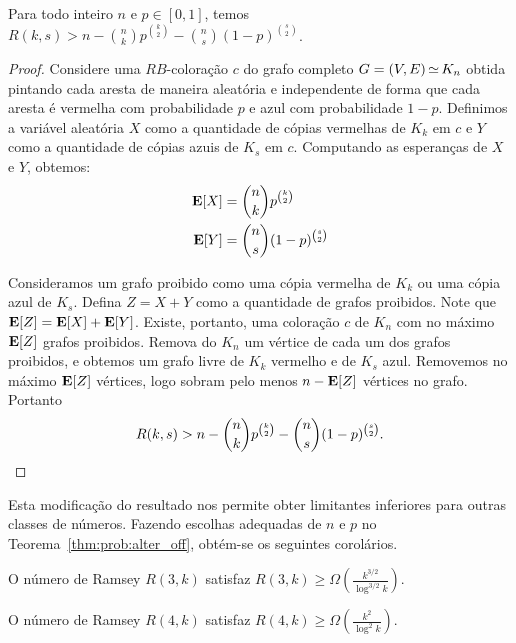 \begin{theorem}
\label{thm:prob:alter_off}
Para todo inteiro $n$ e $p \in [0,1]$, temos $\displaystyle R(k, s) > n - \binom{n}{k}p^{\binom{k}{2}} - \binom{n}{s}(1-p)^{\binom{s}{2}}$.
\end{theorem}
\begin{proof}
Considere uma $RB$-coloração $c$ do grafo completo $G = (V,E) \operatorname{\simeq} K_n$ obtida pintando cada aresta de maneira aleatória e independente de forma que cada aresta é vermelha com probabilidade $p$ e azul com probabilidade $1-p$.
Definimos a variável aleatória $X$ como a quantidade de cópias vermelhas de $K_k$ em $c$ e $Y$ como a quantidade de cópias azuis de $K_s$ em $c$. Computando as esperanças de $X$ e $Y$, obtemos:
\begin{align*}
\operatorname{\mathbf{E}}[X] &= \binom{n}{k}p^{\binom{k}{2}} \\
\operatorname{\mathbf{E}}[Y] &= \binom{n}{s}(1-p)^{\binom{s}{2}}
\end{align*}

Consideramos um grafo proibido como uma cópia vermelha de $K_k$ ou uma cópia azul de $K_s$. Defina $Z = X + Y$ como a quantidade de grafos proibidos. Note que $\operatorname{\mathbf{E}}[Z] = \operatorname{\mathbf{E}}[X] + \operatorname{\mathbf{E}}[Y]$. Existe, portanto, uma coloração $c$ de $K_n$ com no máximo $\operatorname{\mathbf{E}}[Z]$ grafos proibidos. Remova do $K_n$ um vértice de cada um dos grafos proibidos, e obtemos um grafo livre de $K_k$ vermelho e de $K_s$ azul. Removemos no máximo $\operatorname{\mathbf{E}}[Z]$ vértices, logo sobram pelo menos $n - \operatorname{\mathbf{E}}[Z] $ vértices no grafo. Portanto
\[ R(k, s) > n - \binom{n}{k}p^{\binom{k}{2}} - \binom{n}{s}(1-p)^{\binom{s}{2}}.  \qedhere\]
\end{proof}

Esta modificação do resultado nos permite obter limitantes inferiores para outras classes de números. Fazendo escolhas adequadas de $n$ e $p$ no Teorema~\ref{thm:prob:alter_off}, obtém-se os seguintes corolários.

\begin{corollary}
O número de Ramsey $R(3,k)$ satisfaz $\displaystyle R(3,k) \geq  \Omega\left( \frac{k^{3/2}}{\log^{3/2} k}\right)$.
\end{corollary}

\begin{corollary}
O número de Ramsey $R(4,k)$ satisfaz $\displaystyle R(4,k) \geq  \Omega\left( \frac{k^2}{\log^2 k}\right)$.
\end{corollary}

